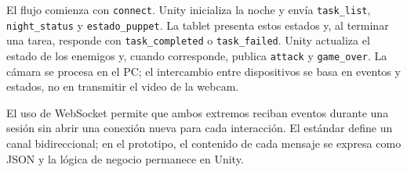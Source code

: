 \documentclass[11pt,a4paper]{article}
\newcommand{\codigo}[1]{\texttt{#1}}
\begin{document}
El flujo comienza con \codigo{connect}. Unity inicializa la noche y envía \codigo{task\_list}, \codigo{night\_status} y \codigo{estado\_puppet}. La tablet presenta estos estados y, al terminar una tarea, responde con \codigo{task\_completed} o \codigo{task\_failed}. Unity actualiza el estado de los enemigos y, cuando corresponde, publica \codigo{attack} y \codigo{game\_over}. La cámara se procesa en el PC; el intercambio entre dispositivos se basa en eventos y estados, no en transmitir el video de la webcam.

El uso de WebSocket permite que ambos extremos reciban eventos durante una sesión sin abrir una conexión nueva para cada interacción. El estándar define un canal bidireccional; en el prototipo, el contenido de cada mensaje se expresa como JSON y la lógica de negocio permanece en Unity.
\end{document}
